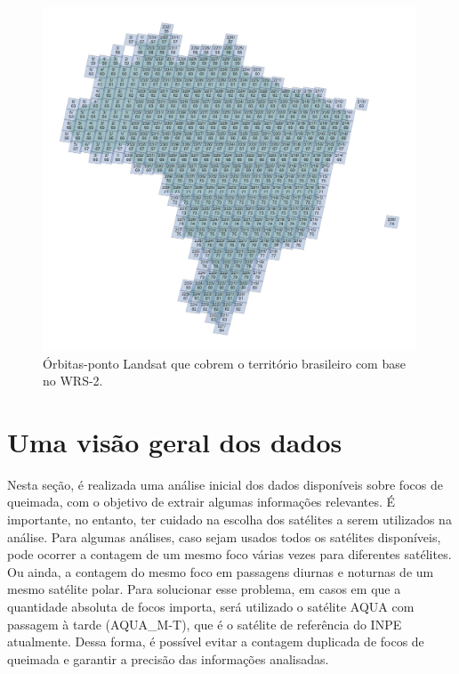 \documentclass[cic,tc]{iiufrgs}
\begin{document}
\begin{figure}[!htb]
    \caption{Órbitas-ponto Landsat que cobrem o território brasileiro com base no WRS-2.}
    \begin{center}
        \includegraphics[width=30em]{orbitas_ponto_landsat}
    \end{center}
    \label{fig:orbitas_ponto_landsat}
\end{figure}

\section{Uma visão geral dos dados}
\label{sec:visao_geral}

Nesta seção, é realizada uma análise inicial dos dados disponíveis sobre focos de queimada, com o objetivo de extrair algumas informações relevantes. É importante, no entanto, ter cuidado na escolha dos satélites a serem utilizados na análise. Para algumas análises, caso sejam usados todos os satélites disponíveis, pode ocorrer a contagem de um mesmo foco várias vezes para diferentes satélites. Ou ainda, a contagem do mesmo foco em passagens diurnas e noturnas de um mesmo satélite polar. Para solucionar esse problema, em casos em que a quantidade absoluta de focos importa, será utilizado o satélite AQUA com passagem à tarde (AQUA\_M-T), que é o satélite de referência do INPE atualmente. Dessa forma, é possível evitar a contagem duplicada de focos de queimada e garantir a precisão das informações analisadas. 
\end{document}
